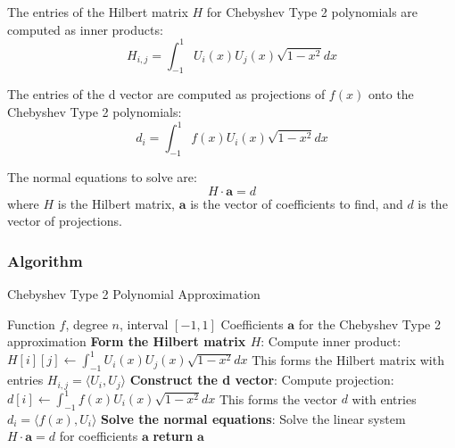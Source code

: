 \documentclass[10pt]{article}
\begin{document}
The entries of the Hilbert matrix \( H \) for Chebyshev Type 2 polynomials are computed as inner products:
\begin{equation}
H_{i,j} = \int_{-1}^{1} U_i(x) U_j(x) \sqrt{1-x^2} dx
\end{equation}

The entries of the d vector are computed as projections of \( f(x) \) onto the Chebyshev Type 2 polynomials:
\begin{equation}
d_i = \int_{-1}^{1} f(x) U_i(x) \sqrt{1-x^2} dx
\end{equation}

The normal equations to solve are:
\begin{equation}
H \cdot \mathbf{a} = d
\end{equation}
where \( H \) is the Hilbert matrix, \( \mathbf{a} \) is the vector of coefficients to find, and \( d \) is the vector of projections.

\subsubsection{Algorithm}
\begin{algorithm}[H]
\caption{Chebyshev Type 2 Polynomial Approximation}\label{alg:chebyshev2}
\begin{algorithmic}
\Require Function $f$, degree $n$, interval $[-1, 1]$
\Ensure Coefficients $\mathbf{a}$ for the Chebyshev Type 2 approximation
\State \textbf{Form the Hilbert matrix $H$}:
        \State Compute inner product: $H[i][j] \gets \int_{-1}^{1} U_i(x) U_j(x) \sqrt{1-x^2} dx$
        \State This forms the Hilbert matrix with entries $H_{i,j} = \langle U_i, U_j \rangle$
    \EndFor
\EndFor
\State \textbf{Construct the d vector}:
    \State Compute projection: $d[i] \gets \int_{-1}^{1} f(x) U_i(x) \sqrt{1-x^2} dx$
    \State This forms the vector $d$ with entries $d_i = \langle f(x), U_i \rangle$
\EndFor
\State \textbf{Solve the normal equations}:
\State Solve the linear system $H \cdot \mathbf{a} = d$ for coefficients $\mathbf{a}$
\State \textbf{return} $\mathbf{a}$
\end{algorithmic}
\end{algorithm}
\end{document}
